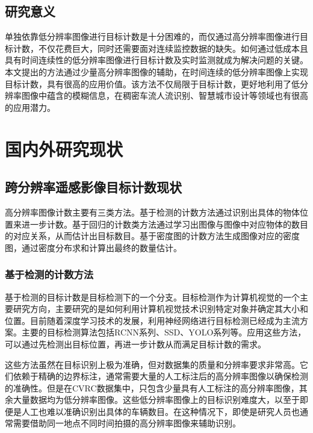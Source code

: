 \subsection{研究意义}
单独依靠低分辨率图像进行目标计数是十分困难的，而仅通过高分辨率图像进行目标计数，不仅花费巨大，同时还需要面对连续监控数据的缺失。如何通过低成本且具有时间连续性的低分辨率图像进行目标计数及实时监测就成为解决问题的关键。本文提出的方法通过少量高分辨率图像的辅助，在时间连续的低分辨率图像上实现目标计数，具有很高的应用价值。该方法不仅局限于目标计数，更好地利用了低分辨率图像中蕴含的模糊信息，在稠密车流人流识别、智慧城市设计等领域也有很高的应用潜力。

\section{国内外研究现状}
\subsection{跨分辨率遥感影像目标计数现状}
高分辨率图像计数主要有三类方法。基于检测的计数方法通过识别出具体的物体位置来进一步计数。基于回归的计数类方法通过学习出图像与图像中对应物体的数目的对应关系，从而估计出目标数目。基于密度图的计数方法生成图像对应的密度图，通过密度分布求和计算出最终的数量估计。

\subsubsection{基于检测的计数方法}
基于检测的目标计数是目标检测下的一个分支。目标检测作为计算机视觉的一个主要研究方向，主要研究的是如何利用计算机视觉技术识别特定对象并确定其大小和位置。目前随着深度学习技术的发展，利用神经网络进行目标检测已经成为主流方案。主要的目标检测算法包括RCNN系列\cite{2014Richfeaturehierarchiesaccurateobjectdetectionsemanticsegmentation}\cite{2015FastRCNN}\cite{2016FasterRCNNRealTimeObjectDetectionRegionProposalNetworks}、SSD\cite{2016SSDSingleShotMultiBoxDetectorb}、YOLO系列\cite{2016YouOnlyLookOnceUnifiedRealTimeObjectDetection}\cite{2016YOLO9000BetterFasterStronger}\cite{2018YOLOv3IncrementalImprovement}等。应用这些方法，可以通过先检测出目标位置，再进一步计数从而满足目标计数的需求。

这些方法虽然在目标识别上极为准确，但对数据集的质量和分辨率要求非常高。它们依赖于精确的边界标注，通常需要大量的人工标注后的高分辨率图像以确保检测的准确性。但是在CVRC数据集中，只包含少量具有人工标注的高分辨率图像，其余大量数据均为低分辨率图像。这些低分辨率图像上的目标识别难度大，以至于即便是人工也难以准确识别出具体的车辆数目。在这种情况下，即使是研究人员也通常需要借助同一地点不同时间拍摄的高分辨率图像来辅助识别。

